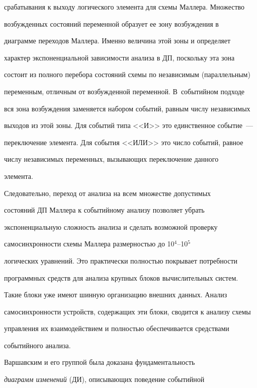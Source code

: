 срабатывания к выходу логического элемента для схемы Маллера. Множество 


возбужденных состояний переменной образует ее зону возбуждения в 


диаграмме переходов Маллера. Именно величина этой зоны и определяет 


характер экспоненциальной зависимости анализа в ДП, поскольку эта зона 


состоит из полного перебора состояний схемы по независимым (параллельным) 


переменным, отличным от возбужденной переменной. В~событийном подходе 


вся зона возбуждения заменяется набором событий, равным числу независимых 


выходов из этой зоны. Для событий типа <<И>> это единственное событие~--- 


переключение элемента. Для события <<ИЛИ>> это число событий, равное 


числу независимых переменных, вызывающих переключение данного 


элемента.


      


      Следовательно, переход от анализа на всем множестве допустимых 


состояний ДП Маллера к событийному анализу позволяет убрать 


экспоненциальную сложность анализа и сделать возможной проверку 


самосинхронности схемы Маллера размерностью до 10$^4$--10$^5$ 


логических уравнений. Это практически полностью покрывает потребности 


программных средств для анализа крупных блоков вычислительных систем. 


Такие блоки уже имеют шинную организацию внешних данных. Анализ 


самосинхронности устройств, содержащих эти блоки, сводится к анализу схемы 


управления их взаимодействием и полностью обеспечивается средствами 


событийного анализа.


      


      Варшавским и его группой была доказана фундаментальность 


\textit{диаграмм изменений} (ДИ), описывающих поведение событийной 


